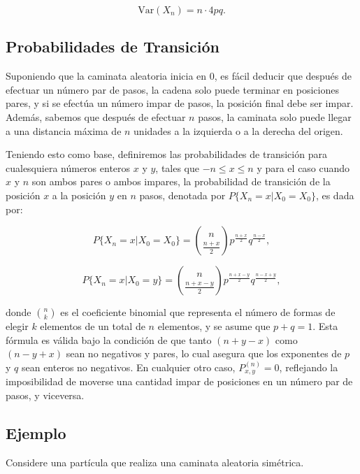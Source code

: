 \documentclass{article}
\begin{document}
\[
    \text{Var}(X_n) = n \cdot 4pq.
\]

\subsection*{Probabilidades de Transición}

Suponiendo que la caminata aleatoria inicia en 0, es fácil deducir que después de efectuar un número par de pasos, la cadena solo puede terminar en posiciones pares, y si se efectúa un número impar de pasos, la posición final debe ser impar. Además, sabemos que después de efectuar $n$ pasos, la caminata solo puede llegar a una distancia máxima de $n$ unidades a la izquierda o a la derecha del origen.

Teniendo esto como base, definiremos las probabilidades de transición para cualesquiera números enteros $x$ y $y$, tales que $-n \leq x \leq n$ y para el caso cuando $x$ y $n$ son ambos pares o ambos impares, la probabilidad de transición de la posición $x$ a la posición $y$ en $n$ pasos, denotada por $P\{X_n = x | X_0 = X_0\}$, es dada por:

\[
    P\{X_n = x | X_0 = X_0\} = \binom{n}{\frac{n + x}{2}} p^{\frac{n + x}{2}} q^{\frac{n - x}{2}},
\]

\[
    P\{X_n = x | X_0 = y\} = \binom{n}{\frac{n + x - y}{2}} p^{\frac{n + x - y}{2}} q^{\frac{n - x + y}{2}},
\]

donde $\binom{n}{k}$ es el coeficiente binomial que representa el número de formas de elegir $k$ elementos de un total de $n$ elementos, y se asume que $p + q = 1$. Esta fórmula es válida bajo la condición de que tanto $(n + y - x)$ como $(n - y + x)$ sean no negativos y pares, lo cual asegura que los exponentes de $p$ y $q$ sean enteros no negativos. En cualquier otro caso, $P_{x,y}^{(n)} = 0$, reflejando la imposibilidad de moverse una cantidad impar de posiciones en un número par de pasos, y viceversa.

\subsection*{Ejemplo}

Considere una partícula que realiza una caminata aleatoria simétrica.
\end{document}
